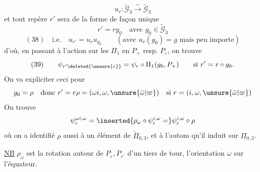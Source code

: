 \[
u_r:\widetilde{\mathcal G}_3\xrightarrow{\sim}\widetilde{\mathcal G}_3
\]
et tout repère $r'$  sera de la forme de façon unique
\[
r'=rg_0\quad\text{avec }g_0\in\widetilde{\mathcal G}_3
\]
\[
(38)\quad\text{i.e.}\quad u_{r'}=u_ru_{g_0}\qquad(\text{avec }u_r(g_0)=g\text{ mais peu importe})
\]
d'où, en passant à l'action sur les $\Pi_1$ en $P_+$ resp. $P_\varepsilon$, on trouve
\[
(39)\qquad \psi_{r'\deleted{\unsure{\varepsilon}}}=\psi_r\circ\Pi_1(g_0,P_+)\qquad\text{si }r'=r\circ g_0.
\]
On va expliciter ceci pour
\[
g_0=\rho\quad\text{donc }r'=r\rho=(\omega i,\omega,\unsure{\bar\omega|\varpi})\quad\text{si }r=(i,\omega,\unsure{\bar\omega|\varpi})
\]
On trouve
\[
\psi_\varepsilon^{\omega i,\omega}=\inserted{\rho_\omega\circ\psi_\varepsilon^{i,\omega}=}\psi_\varepsilon^{i,\omega}\circ\rho
\]
où on a identifié $\rho$ aussi à un élément de $\widetilde\Pi_{0,3}$, et à l'autom qu'il induit sur $\Pi_{0,3}$.

\uline{NB} $\rho_\omega$ est la rotation autour de $P_\varepsilon,P_{\varepsilon'}$ d'un tiers de tour,  l'orientation $\omega$ sur l'équateur.

